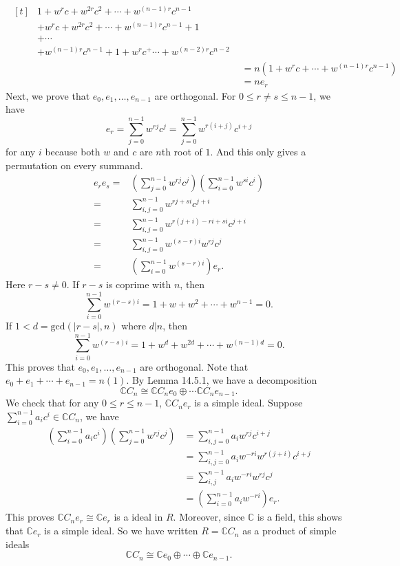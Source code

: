 \documentclass[a4paper, 12pt]{article}
\begin{document}
\begin{solution}
\begin{enumerate}[(1)]
\begin{align*}
\begin{aligned}[t]
            &1+w^r c+w^{2r} c^2+\cdots+w^{(n-1)r}c^{n-1}\\ 
            &+w^r c+w^{2r} c^2+\cdots +w^{(n-1)r}c^{n-1}+1\\ 
            &+\cdots\\ 
            &+w^{(n-1)r}c^{n-1}+1+w^r c^+\cdots+w^{(n-2)r}c^{n-2}
         \end{aligned}\\
         &=n(1+w^r c+\cdots+w^{(n-1)r}c^{n-1})\\ 
         &=ne_r
\end{align*}
Next, we prove that \(e_0,e_1,\ldots,e_{n-1}\) are orthogonal. For \(0\leq r\neq s\leq n-1\), we have
\[e_r=\sum_{j=0}^{n-1}w^{rj}c^j=\sum_{j=0}^{n-1}w^{r(i+j)}c^{i+j}\] 
for any \(i\) because both \(w\) and \(c\) are \(n\)th root of \(1\). And this only gives a permutation on every summand. 
\begin{align*}
    e_re_s=&(\sum_{j=0}^{n-1}w^{rj}c^j)(\sum_{i=0}^{n-1}w^{si}c^i)\\
          =&\sum_{i,j=0}^{n-1}w^{rj+si}c^{j+i}\\ 
          =&\sum_{i,j=0}^{n-1}w^{r(j+i)-ri+si}c^{j+i}\\ 
          =&\sum_{i,j=0}^{n-1}w^{(s-r)i}w^{rj}c^j\\ 
          =&(\sum_{i=0}^{n-1}w^{(s-r)i})e_r.
\end{align*}
Here \(r-s\neq 0\). If \(r-s\) is coprime with \(n\), then 
\[\sum_{i=0}^{n-1}w^{(r-s)i}=1+w+w^2+\cdots+w^{n-1}=0.\]
If \(1<d=\text{gcd}(|r-s|,n)\) where \(d|n\), then 
\[\sum_{i=0}^{n-1}w^{(r-s)i}=1+w^d+w^{2d}+\cdots+w^{(n-1)d}=0.\]
This proves that \(e_0,e_1,\ldots,e_{n-1}\) are orthogonal. Note that \(e_0+e_1+\cdots +e_{n-1}=n(1)\). By Lemma 14.5.1, we have a decomposition 
\[\mathbb{C}C_n\cong \mathbb{C}C_n e_0\oplus \cdots \mathbb{C}C_ne_{n-1}.\]
We check that for any \(0\leq r\leq n-1\), \(\mathbb{C}C_ne_r\) is a simple ideal. Suppose \(\sum_{i=0}^{n-1}a_ic^i\in \mathbb{C}C_n\), we have 
\begin{align*}
    (\sum_{i=0}^{n-1}a_ic^i)(\sum_{j=0}^{n-1}w^{rj}c^j)&= \sum_{i,j=0}^{n-1}a_iw^{rj}c^{i+j}\\ 
                                                       &=\sum_{i,j=0}^{n-1}a_iw^{-ri}w^{r(j+i)}c^{i+j}\\ 
                                                       &=\sum_{i,j}^{n-1}a_iw^{-ri}w^{rj}c^j\\ 
                                                       &=(\sum_{i=0}^{n-1}a_iw^{-ri})e_r.
\end{align*}
This proves \(\mathbb{C}C_ne_r\cong \mathbb{C}e_r\) is a ideal in \(R\). Moreover, since \(\mathbb{C}\) is a field, this shows that \(\mathbb{C}e_r\) is a simple ideal. So we have written \(R=\mathbb{C}C_n\) as a product of simple ideals 
\[\mathbb{C}C_n\cong \mathbb{C}e_0\oplus \cdots\oplus \mathbb{C}e_{n-1}.\] 


\end{enumerate}
\end{solution}
\end{document}
